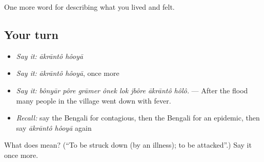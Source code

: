 \begin{grammarlens}[title={What you've built}]
One more word for describing what you lived and felt.
\end{grammarlens}

\subsection*{Your turn}
\begin{itemize}
\raggedright
  \item \emph{Say it:} \emph{ākrāntô hôoyā}
  \item \emph{Say it:} \emph{ākrāntô hôoyā}, once more
  \item \emph{Say it:} \emph{bônyār pôre grāmer ônek lok jbôre ākrāntô hôlô.} — After the flood many people in the village went down with fever.
  \item \emph{Recall:} say the Bengali for contagious, then the Bengali for an epidemic, then say \emph{ākrāntô hôoyā} again
\end{itemize}

\begin{tcolorbox}[breakable,colback=teal!4,colframe=teal!35!black,title={Before you move on}]
What does   mean? (\textquotedblleft{}To be struck down (by an illness); to be attacked\textquotedblright{}.) Say it once more.
\end{tcolorbox}
